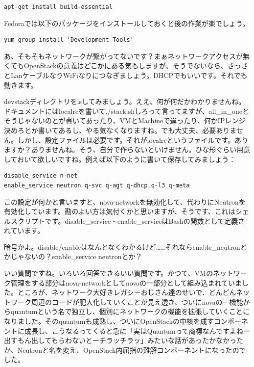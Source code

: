 \documentclass[9pt,b5paper,tombo,openany]{jsbook}
\begin{document}
\begin{lstlisting}
apt-get install build-essential
\end{lstlisting}

Fedoraでは以下のパッケージをインストールしておくと後の作業が楽でしょう。

\begin{lstlisting}
yum group install 'Development Tools'
\end{lstlisting}

あ、そもそもネットワークが繋がってないです？まぁネットワークアクセスが無くてもOpenStackの意義はどこかにある気もしますが、そうでないなら、さっさとLanケーブルなりWiFiなりにつなぎましょう。DHCPでもいいです。それでも動きます。

devstackディレクトリをlsしてみましょう。ええ、何が何だかわかりませんね。ドキュメントにはlocalrcを書いて./stack.shしろって言ってますが、all\_in\_oneとそうじゃないのとが書いてあったり、VMとMachineで違ったり、何かIPレンジ決めろとか書いてあるし、やる気なくなりますね。でも大丈夫、必要ありません。しかし、設定ファイルは必要です。それがlocalrcというファイルです。ありますか？ありませんね。そう、自分で作らないといけません。ひな形ぐらい用意しておいて欲しいですね。例えば以下のように書いて保存してみましょう：

\begin{lstlisting}
disable_service n-net
enable_service neutron q-svc q-agt q-dhcp q-l3 q-meta
\end{lstlisting}

この設定が何かと言いますと、nova-networkを無効化して、代わりにNeutronを有効化しています。勘のよい方は気付くかと思いますが、そうです、これはシェルスクリプトです。disable\_service・enable\_serviceはBashの関数として定義されています。

暗号かよ。disable/enableはなんとなくわかるけど……それならenable\_neutronとかじゃないの？enable\_service neutronとか？

いい質問ですね。いろいろ回答できるいい質問です。かつて、VMのネットワーク管理をする部分はnova-networkとしてnovaの一部分として組み込まれていました。ところが、ネットワーク大好きレガシーおじさん達のせいで、どんどんネットワーク周辺のコードが肥大化していくことが見え透き、ついにnovaの一機能からquantumという名で独立し、個別にネットワークの機能を拡張していくことになりました。そのquantumも成熟し、ついにOpenStackの中核を成すコンポーネントに成長し、こうなるってくると急に「実はQuantumって商標なんですよねー出すもん出してもらわないとーチラッチラッ」みたいな話があったかなかったか、Neutronと名を変え、OpenStack内屈指の難解コンポーネントになったのでした。
\end{document}
